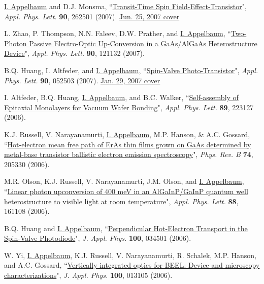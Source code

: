 \documentclass[paper=letter,fontsize=11pt]{scrartcl} %
\newcommand{\PaperEntry}[7]{
		\noindent #1, ``\href{#7}{#2}", \textit{#3} \textbf{#4}, #5 (#6).}
\begin{document}
\begin{etaremune}
\item\PaperEntry{\underline{I. Appelbaum} and D.J. Monsma}{Transit-Time Spin Field-Effect-Transistor}{Appl. Phys. Lett.}{90}{262501}{2007}{http://dx.doi.org/10.1063/1.2752015} \href{http://scitation.aip.org/apl/covers/90_26.jsp}{Jun. 25, 2007 cover}

\item\PaperEntry{L. Zhao, P. Thompson, N.N. Faleev, D.W. Prather, and \underline{I. Appelbaum}}{Two-Photon Passive Electro-Optic Up-Conversion in a GaAs/AlGaAs Heterostructure Device}{Appl. Phys. Lett.}{90}{121132}{2007}{http://dx.doi.org/10.1063/1.2716354}

\item\PaperEntry{B.Q. Huang, I. Altfeder, and \underline{I. Appelbaum}}{Spin-Valve Photo-Transistor}{Appl. Phys. Lett.}{90}{052503}{2007}{http://dx.doi.org/10.1063/1.2436715} \href{http://scitation.aip.org/apl/covers/90_5.jsp}{Jan. 29, 2007 cover} 

\item\PaperEntry{I. Altfeder, B.Q. Huang, \underline{I. Appelbaum}, and B.C. Walker}{Self-assembly of Epitaxial Monolayers for Vacuum Wafer Bonding}{Appl. Phys. Lett.}{89}{223127}{2006}{http://dx.doi.org/10.1063/1.2399358}

\item\PaperEntry{K.J. Russell, V. Narayanamurti, \underline{I. Appelbaum}, M.P. Hanson, \& A.C. Gossard}{Hot-electron mean free path of ErAs thin films grown on GaAs determined by metal-base transistor ballistic electron emission spectroscopy}{Phys. Rev. B}{74}{205330}{2006}{http://dx.doi.org/10.1103/PhysRevB.74.205330}

\item\PaperEntry{M.R. Olson, K.J. Russell, V. Narayanamurti, J.M. Olson, and \underline{I. Appelbaum}}{Linear photon upconversion of 400 meV in an AlGaInP/GaInP quantum well heterostructure to visible light at room temperature}{Appl. Phys. Lett.}{88}{161108}{2006}{http://dx.doi.org/10.1063/1.2195094}

\item\PaperEntry{B.Q. Huang and \underline{I. Appelbaum}}{Perpendicular Hot-Electron Transport in the Spin-Valve Photodiode}{J. Appl. Phys.}{100}{034501}{2006}{http://dx.doi.org/10.1063/1.2220643}

\item\PaperEntry{W. Yi, \underline{I. Appelbaum}, K.J. Russell, V. Narayanamurti, R. Schalek, M.P. Hanson, and A.C. Gossard}{Vertically integrated optics for BEEL: Device and microscopy characterizations}{J. Appl. Phys.}{100}{013105}{2006}{http://dx.doi.org/10.1063/1.2208738}


\end{etaremune}
\end{document}
